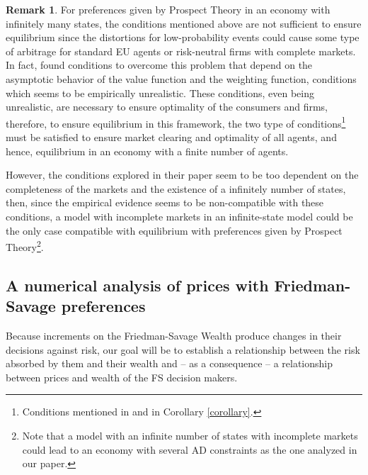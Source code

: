 \documentclass[pdftex]{article}
\numberwithin{equation}{section}
\theoremstyle{th}
\newtheorem{proof lemma}{{Proof Lemma}.}
\theoremstyle{definition}
\newtheorem{remark}{Remark}%
\newtheorem*{risk lovers}{Risk lovers}
\newtheorem*{risk averse}{Risk averse}
\begin{document}
{\begin{remark}{For preferences given by Prospect Theory in an economy with infinitely many states, the conditions mentioned above are not sufficient to ensure equilibrium since the distortions for low-probability events could cause some type of arbitrage for standard EU agents or risk-neutral firms with complete markets. In fact, \cite{AG} found conditions to overcome this problem that depend on the asymptotic behavior of the value function and the weighting function, conditions which seems to be empirically unrealistic. These conditions, even being unrealistic, are necessary to ensure optimality of the consumers and firms, therefore, to ensure equilibrium in this framework, the two type of conditions\footnote{Conditions mentioned in \cite{AG} and in Corollary \ref{corollary}.} must be satisfied to ensure market clearing and optimality of all agents, and hence, equilibrium in an economy with a finite number of agents.

However, the conditions explored in their paper seem to be too dependent on the completeness of the markets and the existence of a infinitely number of states, then, since the empirical evidence seems to be non-compatible with these conditions, a model with incomplete markets in an infinite-state model could be the only case compatible with equilibrium with preferences given by Prospect Theory\footnote{Note that a model with an infinite number of states with incomplete markets could lead to an economy with several AD constraints as the one analyzed in our paper.}.}
\end{remark}





\subsection{A numerical analysis of prices with Friedman-Savage preferences}
Because increments on the Friedman-Savage Wealth produce changes in their decisions against risk, our goal will be to establish a relationship between the risk absorbed by them and their wealth and -- as a consequence -- a relationship between prices and wealth of the FS decision makers.%

}
\end{document}
